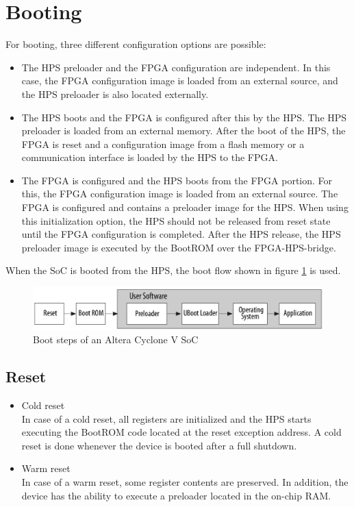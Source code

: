 \section{Booting}
For booting, three different configuration options are possible:\cite[chapter A]{AlteraHPS15}
\begin{itemize}
\item The HPS preloader and the FPGA configuration are independent. In this case, the FPGA configuration image is loaded from an external source, and the HPS preloader is also located externally.
\item The HPS boots and the FPGA is configured after this by the HPS. The HPS preloader is loaded from an external memory. After the boot of the HPS, the FPGA is reset and a configuration image from a flash memory or a communication interface is loaded by the HPS to the FPGA.
\item The FPGA is configured and the HPS boots from the FPGA portion. For this, the FPGA configuration image is loaded from an external source. The FPGA is configured and contains a preloader image for the HPS. When using this initialization option, the HPS should not be released from reset state until the FPGA configuration is completed. After the HPS release, the HPS preloader image is executed by the BootROM over the FPGA-HPS-bridge.
\end{itemize}
When the SoC is booted from the HPS, the boot flow shown in figure \ref{fig:bootstages} is used.
\begin{figure}[htbp]
\begin{center}
\includegraphics[width=13cm,keepaspectratio=true]{bilder/png/bootstages}
\caption{Boot steps of an Altera Cyclone V SoC\cite[chapter A]{AlteraHPS15}}
\label{fig:bootstages}
\end{center}
\end{figure}
\subsection{Reset}
\begin{itemize}
\item Cold reset\\
In case of a cold reset, all registers are initialized and the HPS starts executing the BootROM code located at the reset exception address. A cold reset is done whenever the device is booted after a full shutdown.
\item Warm reset\\
In case of a warm reset, some register contents are preserved. In addition, the device has the ability to execute a preloader located in the on-chip RAM.
\end{itemize}
